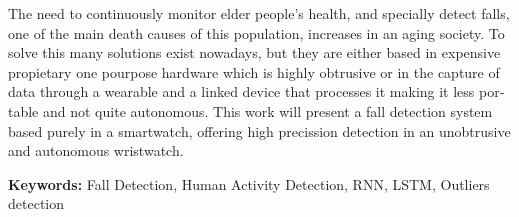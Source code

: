 \documentclass[../tfm.tex]{subfiles}
\begin{document}
\begin{otherlanguage}{english}
The need to continuously monitor elder people's health, and specially detect falls, one of the main death causes of this population, increases in an aging society. To solve this many solutions exist nowadays, but they are either based in expensive propietary one pourpose hardware which is highly obtrusive or in the capture of data through a wearable and a linked device that processes it making it less portable and not quite autonomous. This work will present a fall detection system based purely in a smartwatch, offering high precission detection in an unobtrusive and autonomous wristwatch.

{\bf Keywords:} Fall Detection, Human Activity Detection, RNN, LSTM, Outliers detection
\end{otherlanguage}
\end{document}
